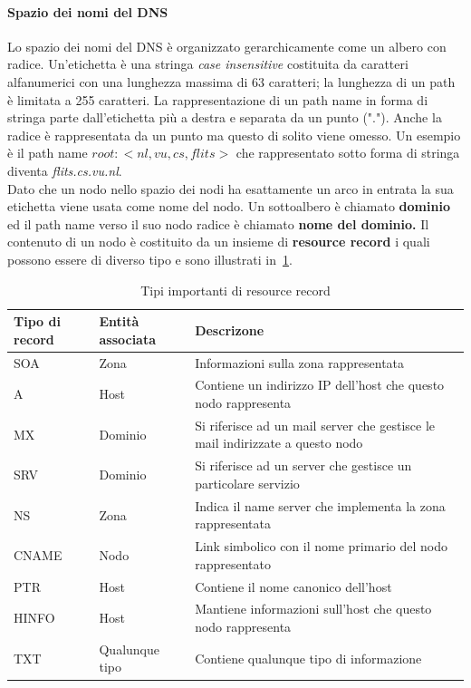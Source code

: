 \paragraph{Spazio dei nomi del DNS}
Lo spazio dei nomi del DNS è organizzato gerarchicamente come un albero con radice.
Un'etichetta è una stringa \emph{case insensitive} costituita da caratteri alfanumerici con una lunghezza massima di 63 caratteri; la lunghezza di un path è limitata a 255 caratteri. La rappresentazione di un path name in forma di stringa parte dall'etichetta più a destra e separata da un punto ("."). Anche la radice è rappresentata da un punto ma questo di solito viene omesso. Un esempio è il path name $root:<nl,vu,cs,flits>$ che rappresentato sotto forma di stringa diventa \emph{flits.cs.vu.nl}.\\
Dato che un nodo nello spazio dei nodi ha esattamente un arco in entrata la sua etichetta viene usata come nome del nodo. Un sottoalbero è chiamato \textbf{dominio} ed il path name verso il suo nodo radice è chiamato \textbf{nome del dominio.} Il contenuto di un nodo è costituito da un insieme di \textbf{resource record} i quali possono essere di diverso tipo e sono illustrati in \tablename\,\ref{tab:resource}.
\begin{table}
\centering
\begin{tabular}{|l|l|p{}|}
\hline
\textbf{Tipo di record} & \textbf{Entità associata} & \textbf{Descrizone} \\
\hline
SOA & Zona & Informazioni sulla zona rappresentata \\
A & Host & Contiene un indirizzo IP dell'host che questo nodo rappresenta \\
MX & Dominio & Si riferisce ad un mail server che gestisce le mail indirizzate a questo nodo \\
SRV & Dominio & Si riferisce ad un server che gestisce un particolare servizio \\
NS & Zona & Indica il name server che implementa la zona rappresentata \\
CNAME & Nodo & Link simbolico con il nome primario del nodo rappresentato \\
PTR & Host & Contiene il nome canonico dell'host \\
HINFO & Host & Mantiene informazioni sull'host che questo nodo rappresenta \\
TXT & Qualunque tipo & Contiene qualunque tipo di informazione \\
\hline
\end{tabular}
\caption{Tipi importanti di resource record}\label{tab:resource}
\end{table}
